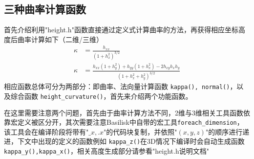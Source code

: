 \documentclass[lang=cn,11pt,a4paper]{elegantpaper}
\begin{document}
\subsection{三种曲率计算函数}
首先介绍利用"height.h"函数直接通过定义式计算曲率的方法，再获得相应坐标高度后曲率计算如下（二维/三维）
\begin{align}
  \kappa &= \frac{h_{xx}}{(1 + h_x^2)^{3/2}}\\
  \kappa &= \frac{h_{xx}(1 + h_y^2) + h_{yy}(1 + h_x^2) - 2h_{xy}h_xh_y}{(1 + h_x^2 + h_y^2)^{3/2}}
\end{align}
相应函数总体可分为两部分：即曲率、法向量计算函数 \texttt{kappa(), normal()}，以及综合函数 \texttt{height_curvature()}，首先来介绍两个功能函数。\par  
在这里需要注意两个问题，首先由于曲率计算方法不同，2维与3维相关工具函数依靠宏定义被区分开，其次需要注意Basilisk中自带的宏工具\texttt{foreach_dimension}，该工具会在编译阶段将带有"$\_x,.x$"的代码块复制，并依照"$(x,y,z)$"的顺序进行递进，下文中出现的定义的函数例如 \texttt{kappa_z()}在3D情况下编译时会自动生成函数 \texttt{kappa_y(),kappa_x()}，相关高度生成部分请参看"height.h说明文档" 
\end{document}
